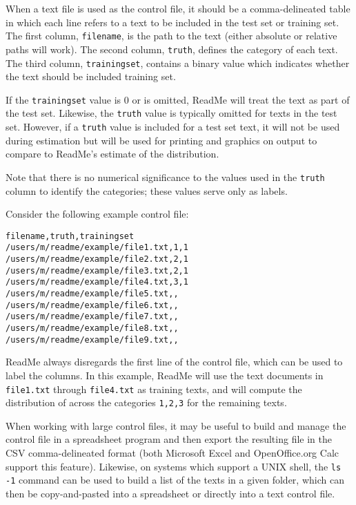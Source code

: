 \documentclass[oneside,letterpaper,titlepage]{article}
\begin{document}
When a text file is used as the control file, it should be a
comma-delineated table in which each line refers to a text to be
included in the test set or training set. The first column,
\texttt{filename}, is the path to the text (either absolute or
relative paths will work). The second column, \texttt{truth}, defines
the category of each text. The third column, \texttt{trainingset},
contains a binary value which indicates whether the text should be
included training set.

If the \texttt{trainingset} value is 0 or is omitted, ReadMe will
treat the text as part of the test set. Likewise, the \texttt{truth}
value is typically omitted for texts in the test set. However, if a
\texttt{truth} value is included for a test set text, it will not be
used during estimation but will be used for printing and graphics on
output to compare to ReadMe's estimate of the distribution.

Note that there is no numerical significance to the values used in the
\texttt{truth} column to identify the categories; these values serve
only as labels.

Consider the following example control file:  
\begin{verbatim}
filename,truth,trainingset
/users/m/readme/example/file1.txt,1,1
/users/m/readme/example/file2.txt,2,1
/users/m/readme/example/file3.txt,2,1
/users/m/readme/example/file4.txt,3,1
/users/m/readme/example/file5.txt,,
/users/m/readme/example/file6.txt,,
/users/m/readme/example/file7.txt,,
/users/m/readme/example/file8.txt,,
/users/m/readme/example/file9.txt,, 
\end{verbatim}

ReadMe always disregards the first line of the control file, which can
be used to label the columns.  In this example, ReadMe will use the
text documents in \texttt{file1.txt} through \texttt{file4.txt} as
training texts, and will compute the distribution of across the
categories \texttt{1,2,3} for the remaining texts.

When working with large control files, it may be useful to build and
manage the control file in a spreadsheet program and then export the
resulting file in the CSV comma-delineated format (both Microsoft
Excel and OpenOffice.org Calc support this feature). Likewise, on
systems which support a UNIX shell, the \texttt{ls -1} command can be
used to build a list of the texts in a given folder, which can then be
copy-and-pasted into a spreadsheet or directly into a text control
file.
\end{document}
